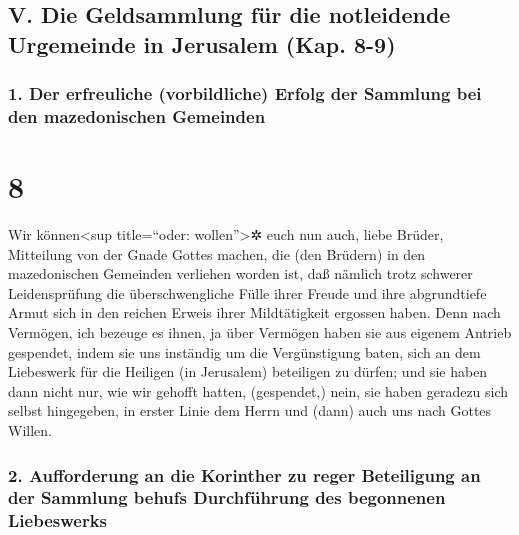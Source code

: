 \hypertarget{v.-die-geldsammlung-fuxfcr-die-notleidende-urgemeinde-in-jerusalem-kap.-8-9}{%
\subsection{V. Die Geldsammlung für die notleidende Urgemeinde in
Jerusalem (Kap.
8-9)}\label{v.-die-geldsammlung-fuxfcr-die-notleidende-urgemeinde-in-jerusalem-kap.-8-9}}

\hypertarget{der-erfreuliche-vorbildliche-erfolg-der-sammlung-bei-den-mazedonischen-gemeinden}{%
\subsubsection{1. Der erfreuliche (vorbildliche) Erfolg der Sammlung bei
den mazedonischen
Gemeinden}\label{der-erfreuliche-vorbildliche-erfolg-der-sammlung-bei-den-mazedonischen-gemeinden}}

\hypertarget{section-7}{%
\section{8}\label{section-7}}

 Wir können\textless sup title=``oder:
wollen''\textgreater✲ euch nun auch, liebe Brüder, Mitteilung von der
Gnade Gottes machen, die (den Brüdern) in den mazedonischen Gemeinden
verliehen worden ist,  daß nämlich trotz schwerer
Leidensprüfung die überschwengliche Fülle ihrer Freude und ihre
abgrundtiefe Armut sich in den reichen Erweis ihrer Mildtätigkeit
ergossen haben.  Denn nach Vermögen, ich bezeuge es ihnen,
ja über Vermögen haben sie aus eigenem Antrieb gespendet, 
indem sie uns inständig um die Vergünstigung baten, sich an dem
Liebeswerk für die Heiligen (in Jerusalem) beteiligen zu dürfen;
 und sie haben dann nicht nur, wie wir gehofft hatten,
(gespendet,) nein, sie haben geradezu sich selbst hingegeben, in erster
Linie dem Herrn und (dann) auch uns nach Gottes Willen.

\hypertarget{aufforderung-an-die-korinther-zu-reger-beteiligung-an-der-sammlung-behufs-durchfuxfchrung-des-begonnenen-liebeswerks}{%
\subsubsection{2. Aufforderung an die Korinther zu reger Beteiligung an
der Sammlung behufs Durchführung des begonnenen
Liebeswerks}\label{aufforderung-an-die-korinther-zu-reger-beteiligung-an-der-sammlung-behufs-durchfuxfchrung-des-begonnenen-liebeswerks}}

